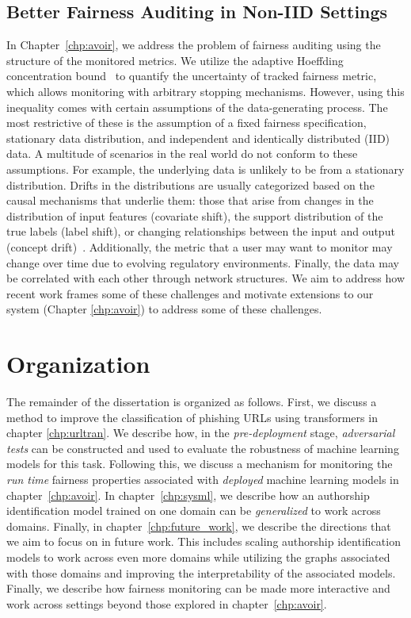 \subsection{Better Fairness Auditing in Non-IID Settings}
In Chapter~\ref{chp:avoir}, we address the problem of fairness auditing using the structure of the monitored metrics.
We utilize the adaptive Hoeffding concentration bound~\cite{zhao2016adaptive} to quantify the uncertainty of tracked fairness metric, which allows monitoring with arbitrary stopping mechanisms.
However, using this inequality comes with certain assumptions of the data-generating process.
The most restrictive of these is the assumption of a fixed fairness specification, stationary data distribution, and independent and identically distributed (IID) data.
A multitude of scenarios in the real world do not conform to these assumptions.
For example, the underlying data is unlikely to be from a stationary distribution.
Drifts in the distributions are usually categorized based on the causal mechanisms that underlie them:
those that arise from changes in the distribution of input features (covariate shift), the support distribution of the true labels (label shift), or changing relationships between the input and output (concept drift)~\citep{huyen2022designing}.
Additionally, the metric that a user may want to monitor may change over time due to evolving regulatory environments.
Finally, the data may be correlated with each other through network structures.
We aim to address how recent work frames some of these challenges and motivate extensions to our system \AVOIRmethodname (Chapter \ref{chp:avoir}) to address some of these challenges.

\section{Organization}
The remainder of the dissertation is organized as follows. 
First, we discuss a method to improve the classification of phishing URLs using transformers in chapter \ref{chp:urltran}.
We describe how, in the \textit{pre-deployment} stage, \textit{adversarial tests} can be constructed and used to evaluate the robustness of machine learning models for this task.
Following this, we discuss a mechanism for monitoring the \textit{run time} fairness properties associated with \textit{deployed} machine learning models in chapter~\ref{chp:avoir}.
In chapter~\ref{chp:sysml}, we describe how an authorship identification model trained on one domain can be \textit{generalized} to work across domains.
Finally, in chapter~\ref{chp:future_work}, we describe the directions that we aim to focus on in future work. 
This includes scaling authorship identification models to work across even more domains while utilizing the graphs associated with those domains and improving the interpretability of the associated models.
Finally, we describe how fairness monitoring can be made more interactive and work across settings beyond those explored in chapter~\ref{chp:avoir}.


\endinput